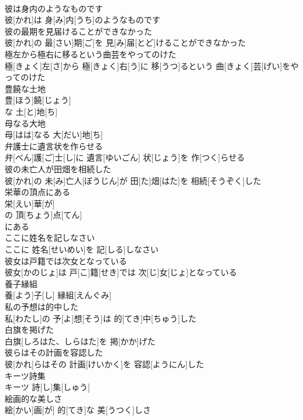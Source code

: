 \documentclass[8pt]{extreport}
\begin{document}
\begin{CJK}{UTF8}{min}
\\	彼は身内のようなものです	
\\	彼[かれ]は 身[み]内[うち]のようなものです
\\	彼の最期を見届けることができなかった	
\\	彼[かれ]の 最[さい]期[ご]を 見[み]届[とど]けることができなかった
\\	極左から極右に移るという曲芸をやってのけた	
\\	極[きょく]左[さ]から 極[きょく]右[う]に 移[うつ]るという 曲[きょく]芸[げい]をやってのけた
\\	豊饒な土地	
\\	豊[ほう]饒[じょう]
\\	な 土[と]地[ち]
\\	母なる大地	
\\	母[はは]なる 大[だい]地[ち]
\\	弁護士に遺言状を作らせる	
\\	弁[べん]護[ご]士[し]に 遺言[ゆいごん] 状[じょう]を 作[つく]らせる
\\	彼の未亡人が田畑を相続した	
\\	彼[かれ]の 未[み]亡人[ぼうじん]が 田[た]畑[はた]を 相続[そうぞく]した
\\	栄華の頂点にある	
\\	栄[えい]華[が]
\\	の 頂[ちょう]点[てん]
\\	にある 
\\	ここに姓名を記しなさい	
\\	ここに 姓名[せいめい]を 記[しる]しなさい
\\	彼女は戸籍では次女となっている	
\\	彼女[かのじょ]は 戸[こ]籍[せき]では 次[じ]女[じょ]となっている
\\	養子縁組	
\\	養[よう]子[し] 縁組[えんぐみ]
\\	私の予想は的中した	
\\	私[わたし]の 予[よ]想[そう]は 的[てき]中[ちゅう]した
\\	白旗を掲げた	
\\	白旗[しろはた、しらはた]を 掲[かか]げた
\\	彼らはその計画を容認した	
\\	彼[かれ]らはその 計画[けいかく]を 容認[ようにん]した
\\	キーツ詩集	
\\	キーツ 詩[し]集[しゅう]
\\	絵画的な美しさ	
\\	絵[かい]画[が] 的[てき]な 美[うつく]しさ

\end{CJK}
\end{document}
